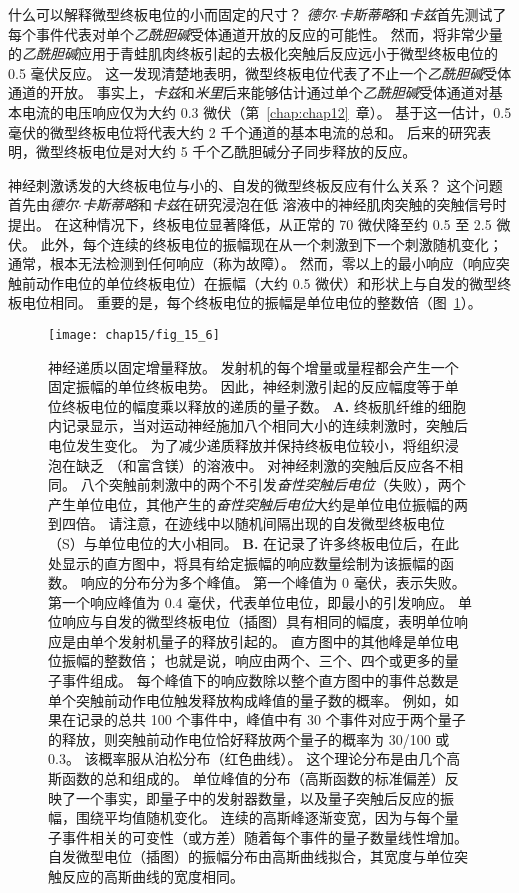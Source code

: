 什么可以解释微型终板电位的小而固定的尺寸？
\textit{德尔$\cdot$卡斯蒂略}和\textit{卡兹}首先测试了每个事件代表对单个\textit{乙酰胆碱}受体通道开放的反应的可能性。
然而，将非常少量的\textit{乙酰胆碱}应用于青蛙肌肉终板引起的去极化突触后反应远小于微型终板电位的 0.5 毫伏反应。 
这一发现清楚地表明，微型终板电位代表了不止一个\textit{乙酰胆碱}受体通道的开放。
事实上，\textit{卡兹}和\textit{米里}后来能够估计通过单个\textit{乙酰胆碱}受体通道对基本电流的电压响应仅为大约 0.3 微伏（第~\ref{chap:chap12}~章）。
基于这一估计，0.5 毫伏的微型终板电位将代表大约 2 千个通道的基本电流的总和。
后来的研究表明，微型终板电位是对大约 5 千个乙酰胆碱分子同步释放的反应。


神经刺激诱发的大终板电位与小的、自发的微型终板反应有什么关系？
这个问题首先由\textit{德尔$\cdot$卡斯蒂略}和\textit{卡兹}在研究浸泡在低  溶液中的神经肌肉突触的突触信号时提出。
在这种情况下，终板电位显著降低，从正常的 70 微伏降至约 0.5 至 2.5 微伏。
此外，每个连续的终板电位的振幅现在从一个刺激到下一个刺激随机变化；
通常，根本无法检测到任何响应（称为故障）。
然而，零以上的最小响应（响应突触前动作电位的单位终板电位）在振幅（大约 0.5 微伏）和形状上与自发的微型终板电位相同。
重要的是，每个终板电位的振幅是单位电位的整数倍（图~\ref{fig:15_6}）。


\begin{figure}[htbp]
	\centering
	\texttt{[image: chap15/fig\_15\_6]}
	\caption{神经递质以固定增量释放。
		发射机的每个增量或量程都会产生一个固定振幅的单位终板电势。
		因此，神经刺激引起的反应幅度等于单位终板电位的幅度乘以释放的递质的量子数。
		\textbf{A.} 终板肌纤维的细胞内记录显示，当对运动神经施加八个相同大小的连续刺激时，突触后电位发生变化。
		为了减少递质释放并保持终板电位较小，将组织浸泡在缺乏 （和富含镁）的溶液中。
		对神经刺激的突触后反应各不相同。
		八个突触前刺激中的两个不引发\textit{奋性突触后电位}（失败），两个产生单位电位，其他产生的\textit{奋性突触后电位}大约是单位电位振幅的两到四倍。
		请注意，在迹线中以随机间隔出现的自发微型终板电位（S）与单位电位的大小相同\cite{liley1956quantal}。
		\textbf{B.} 在记录了许多终板电位后，在此处显示的直方图中，将具有给定振幅的响应数量绘制为该振幅的函数。
		响应的分布分为多个峰值。
		第一个峰值为 0 毫伏，表示失败。
		第一个响应峰值为 0.4 毫伏，代表单位电位，即最小的引发响应。
		单位响应与自发的微型终板电位（插图）具有相同的幅度，表明单位响应是由单个发射机量子的释放引起的。
		直方图中的其他峰是单位电位振幅的整数倍；
		也就是说，响应由两个、三个、四个或更多的量子事件组成。
		每个峰值下的响应数除以整个直方图中的事件总数是单个突触前动作电位触发释放构成峰值的量子数的概率。
		例如，如果在记录的总共 100 个事件中，峰值中有 30 个事件对应于两个量子的释放，则突触前动作电位恰好释放两个量子的概率为 30/100 或 0.3。
		该概率服从泊松分布（红色曲线）。
		这个理论分布是由几个高斯函数的总和组成的。
		单位峰值的分布（高斯函数的标准偏差）反映了一个事实，即量子中的发射器数量，以及量子突触后反应的振幅，围绕平均值随机变化。
		连续的高斯峰逐渐变宽，因为与每个量子事件相关的可变性（或方差）随着每个事件的量子数量线性增加。
		自发微型电位（插图）的振幅分布由高斯曲线拟合，其宽度与单位突触反应的高斯曲线的宽度相同\cite{boyd1956end}。}
	\label{fig:15_6}
\end{figure}


